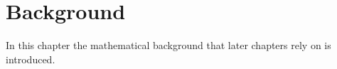 \chapter{Background}\label{sec:chapter2}

In this chapter the mathematical background that later chapters rely on is introduced.

